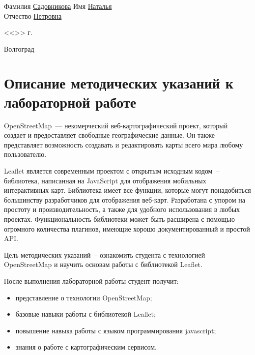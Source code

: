 \documentclass[a4paper, 14pt]{extreport}
\begin{document}
\begin{titlepage}
\begin{flushleft}
            Фамилия \underline{Садовникова\hspace{2.1cm}} Имя \underline{Наталья\hspace{5.5cm}}\\
            Отчество \underline{Петровна\hspace{2.8cm}}
        \end{flushleft}
        \vspace{1.5cm}
        \begin{flushright}
            <<\underline{\hspace{1.0cm}}>>\underline{\hspace{4.0cm}} \the\year г.
        \end{flushright}
        \vspace{\fill}
        \begin{center}
            Волгоград \the\year
        \end{center}
    \end{titlepage}
    \tableofcontents
    \onehalfspacing
    \chapter{Описание методических указаний к лабораторной работе}
    OpenStreetMap~--- некомерческий веб-картографический проект, который
    создает и предоставляет свободные географические данные. Он также
    представляет возможность создавать и редактировать карты всего мира
    любому пользователю.

    Leaflet является современным проектом с открытым исходным кодом~--
    библиотека, написанная на JavaScript для отображения мобильных
    интерактивных карт. Библиотека имеет все функции, которые могут
    понадобиться большинству разработчиков для отображения веб-карт.
    Разработана с упором на простоту и производительность, а также для удобного
    использования в любых проектах. Функциональность библиотеки может быть
    расширена с помощью огромного количества плагинов, имеющие хорошо
    документированный и простой API.

    Цель методических указаний~-- ознакомить студента с технологией \\
    OpenStreetMap и научить основам работы с библиотекой Leaflet.

    После выполнения лабораторной работы студент получит:
    \begin{itemize}
        \item представление о технологии OpenStreetMap;
        \item базовые навыки работы с библиотекой Leaflet;
        \item повышение навыка работы с языком программирования javascript;
        \item знания о работе с картографическим сервисом.
    \end{itemize}
    
\end{document}

